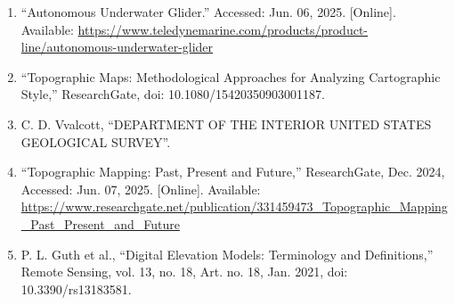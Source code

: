 \documentclass{article}
\begin{document}
\begin{sloppypar}
\begin{enumerate}
    \item{“Autonomous Underwater Glider.” Accessed: Jun. 06, 2025. [Online]. Available: \url{https://www.teledynemarine.com/products/product-line/autonomous-underwater-glider}}

    \item{“Topographic Maps: Methodological Approaches for Analyzing Cartographic Style,” ResearchGate, doi: 10.1080/15420350903001187.}

    \item{C. D. Vvalcott, “DEPARTMENT OF THE INTERIOR UNITED STATES GEOLOGICAL SURVEY”.}

    \item{“Topographic Mapping: Past, Present and Future,” ResearchGate, Dec. 2024, Accessed: Jun. 07, 2025. [Online]. Available: \url{https://www.researchgate.net/publication/331459473_Topographic_Mapping_Past_Present_and_Future}}

    \item{P. L. Guth et al., “Digital Elevation Models: Terminology and Definitions,” Remote Sensing, vol. 13, no. 18, Art. no. 18, Jan. 2021, doi: 10.3390/rs13183581.}

\end{enumerate}
\end{sloppypar}

\end{document}
